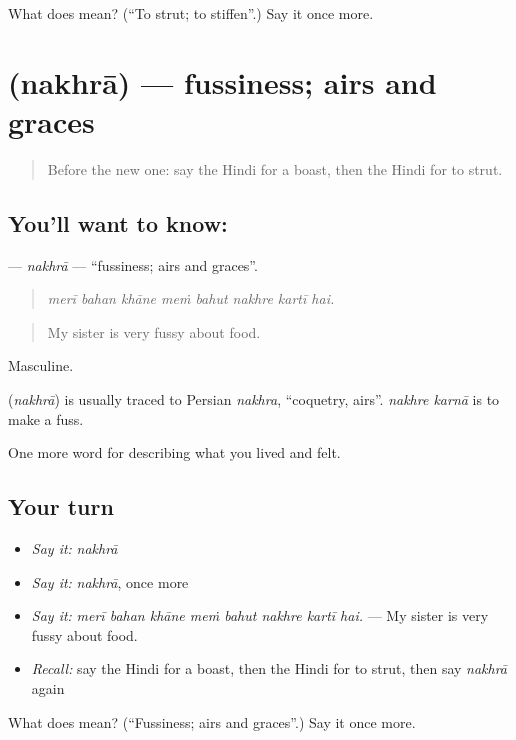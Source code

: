 \begin{tcolorbox}[breakable,colback=teal!4,colframe=teal!35!black,title={Before you move on}]
What does  mean? (\textquotedblleft{}To strut; to stiffen\textquotedblright{}.) Say it once more.
\end{tcolorbox}
\section[\texorpdfstring{\hi{नख़रा} (nakhrā)}{नख़रा (nakhrā)}]{ (nakhrā) — fussiness; airs and graces}

\label{lesson:HI-C462-nakhra}



\begin{quote}
Before the new one: say the Hindi for a boast, then the Hindi for to strut.
\end{quote}

\subsection*{You'll want to know: }
\textbf{} — \emph{nakhrā} — \textquotedblleft{}fussiness; airs and graces\textquotedblright{}.

\begin{quote}
       
\end{quote}

\begin{quote}
\emph{merī bahan khāne meṁ bahut nakhre kartī hai.}
\end{quote}

\begin{quote}
My sister is very fussy about food.
\end{quote}

Masculine.

\begin{cousinweb}
\textbf{} (\emph{nakhrā}) is usually traced to Persian \emph{nakhra}, \textquotedblleft{}coquetry, airs\textquotedblright{}. \emph{nakhre karnā} is to make a fuss.
\end{cousinweb}

\begin{grammarlens}[title={What you've built}]
One more word for describing what you lived and felt.
\end{grammarlens}

\subsection*{Your turn}
\begin{itemize}
\raggedright
  \item \emph{Say it:} \emph{nakhrā}
  \item \emph{Say it:} \emph{nakhrā}, once more
  \item \emph{Say it:} \emph{merī bahan khāne meṁ bahut nakhre kartī hai.} — My sister is very fussy about food.
  \item \emph{Recall:} say the Hindi for a boast, then the Hindi for to strut, then say \emph{nakhrā} again
\end{itemize}

\begin{tcolorbox}[breakable,colback=teal!4,colframe=teal!35!black,title={Before you move on}]
What does  mean? (\textquotedblleft{}Fussiness; airs and graces\textquotedblright{}.) Say it once more.
\end{tcolorbox}

